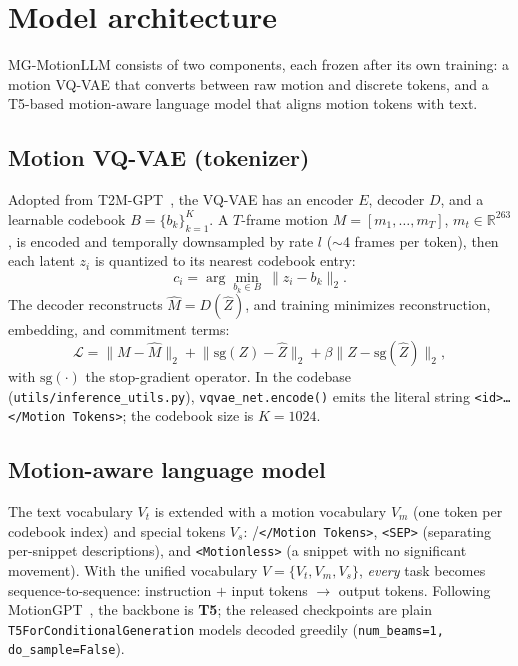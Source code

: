 \documentclass[10pt,twocolumn]{article}
\newcommand{\code}[1]{\texttt{\small #1}}
\begin{document}
\section{Model architecture}
MG-MotionLLM consists of two components, each frozen after its own training: a motion VQ-VAE that
converts between raw motion and discrete tokens, and a T5-based motion-aware language model that
aligns motion tokens with text.

\subsection{Motion VQ-VAE (tokenizer)}
Adopted from T2M-GPT~\cite{t2mgpt}, the VQ-VAE has an encoder $E$, decoder $D$, and a learnable codebook
$B=\{b_k\}_{k=1}^{K}$. A $T$-frame motion $M=[m_1,\dots,m_T]$, $m_t\in\mathbb{R}^{263}$, is encoded
and temporally downsampled by rate $l$ ($\sim$4 frames per token), then each latent $z_i$ is
quantized to its nearest codebook entry:
\begin{equation}
  c_i = \arg\min_{b_k\in B}\ \lVert z_i - b_k \rVert_2 .
\end{equation}
The decoder reconstructs $\hat{M}=D(\hat{Z})$, and training minimizes reconstruction, embedding,
and commitment terms:
\begin{equation}
  \mathcal{L} = \lVert M-\hat{M}\rVert_2 + \lVert\mathrm{sg}(Z)-\hat{Z}\rVert_2
              + \beta\lVert Z-\mathrm{sg}(\hat{Z})\rVert_2 ,
\end{equation}
with $\mathrm{sg}(\cdot)$ the stop-gradient operator. In the codebase
(\code{utils/inference\_utils.py}), \code{vqvae\_net.encode()} emits the literal string
\code{<Motion Tokens><id>\ldots</Motion Tokens>}; the codebook size is $K=1024$.

\subsection{Motion-aware language model}
The text vocabulary $V_t$ is extended with a motion vocabulary $V_m$ (one token per codebook
index) and special tokens $V_s$: \code{<Motion Tokens>}/\code{</Motion Tokens>}, \code{<SEP>}
(separating per-snippet descriptions), and \code{<Motionless>} (a snippet with no significant
movement). With the unified vocabulary $V=\{V_t,V_m,V_s\}$, \emph{every} task becomes
sequence-to-sequence: instruction $+$ input tokens $\rightarrow$ output tokens. Following
MotionGPT~\cite{motiongpt}, the backbone is \textbf{T5}; the released checkpoints are plain
\code{T5ForConditionalGeneration} models decoded greedily (\code{num\_beams=1, do\_sample=False}).
\end{document}
